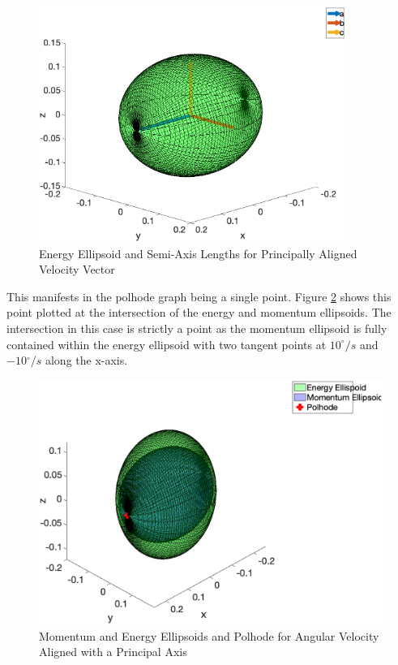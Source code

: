 \begin{figure}[H]
    \centering
    \captionsetup{justification = centering}
    \includegraphics[width = 10cm]{Images/energy_axes_principal.png}
    \caption{Energy Ellipsoid and Semi-Axis Lengths for Principally Aligned Velocity Vector}
    \label{fig:energy_axis_verification_princ}
\end{figure}

This manifests in the polhode graph being a single point. Figure \ref{fig:ellipsoid_super_plot_principal} shows this point plotted at the intersection of the energy and momentum ellipsoids. The intersection in this case is strictly a point as the momentum ellipsoid is fully contained within the energy ellipsoid with two tangent points at  $10^{\circ}/s$ and $-10{}^{\circ}/s$ along the x-axis. 

\begin{figure}[H]
    \centering
    \captionsetup{justification = centering}
    \includegraphics[width = 12cm] {Images/ellipsoid_polhode_principal.png}
    \caption{Momentum and Energy Ellipsoids and Polhode for Angular Velocity Aligned with a Principal Axis}
    \label{fig:ellipsoid_super_plot_principal}
\end{figure}

